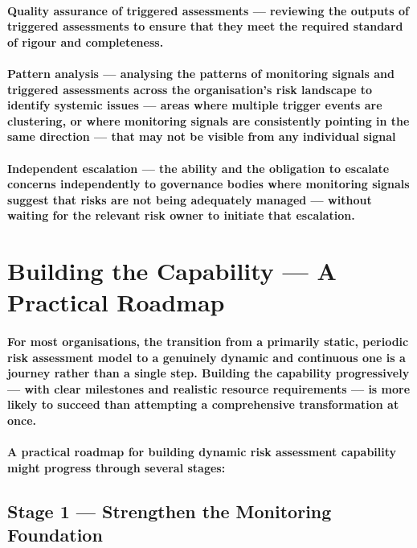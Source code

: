\paragraph{\textbf{Quality assurance of triggered assessments} — reviewing the outputs of triggered assessments to ensure that they meet the required standard of rigour and completeness.}
\paragraph{\textbf{Pattern analysis} — analysing the patterns of monitoring signals and triggered assessments across the organisation's risk landscape to identify systemic issues — areas where multiple trigger events are clustering, or where monitoring signals are consistently pointing in the same direction — that may not be visible from any individual signal}
\paragraph{\textbf{Independent escalation} — the ability and the obligation to escalate concerns independently to governance bodies where monitoring signals suggest that risks are not being adequately managed — without waiting for the relevant risk owner to initiate that escalation.}

\section{Building the Capability — A Practical Roadmap}
\paragraph{For most organisations, the transition from a primarily static, periodic risk assessment model to a genuinely dynamic and continuous one is a journey rather than a single step. Building the capability progressively — with clear milestones and realistic resource requirements — is more likely to succeed than attempting a comprehensive transformation at once.}
\paragraph{A practical roadmap for building dynamic risk assessment capability might progress through several stages:}

\subsection{Stage 1 — Strengthen the Monitoring Foundation}
